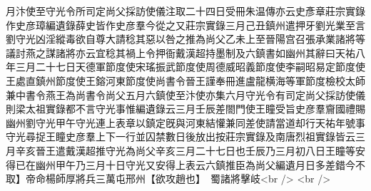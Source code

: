 月汴使至守光令所司定尚父採訪使儀注取二十四日受冊朱温傳亦云史彥章莊宗實錄作史彦璋編遺錄薛史皆作史彦羣今從之又莊宗實錄三月己丑鎮州遣押牙劉光業至言劉守光凶淫縱毒欲自尊大請稔其惡以咎之推為尚父乙未上至晉陽宫召張承業諸將等議討燕之謀諸將亦云宜稔其禍上令押衙戴漢超持墨制及六鎮書如幽州其辭曰天祐八年三月二十七日天德軍節度使宋瑤振武節度使周德威昭義節度使李嗣昭易定節度使王處直鎮州節度使王鎔河東節度使尚書令晉王謹奉冊進盧龍横海等軍節度檢校太師兼中書令燕王為尚書令尚父五月六鎮使至汴使亦集六月守光令有司定尚父採訪使儀則梁太祖實錄都不言守光事惟編遺錄云三月壬辰差閤門使王瞳受旨史彦羣齎國禮賜幽州劉守光甲午守光連上表章以鎮定旣與河東結懽兼同差使請當道却行天祐年號事守光尋捉王瞳史彦羣上下一行並囚禁數日後放出按莊宗實錄及南唐烈祖實錄皆云三月辛亥晉王遣戴漢超推守光為尚父辛亥三月二十七日也壬辰乃三月初八日王瞳等安得已在幽州甲午乃三月十日守光又安得上表云六鎮推臣為尚父編遺月日多差錯今不取】帝命楊師厚將兵三萬屯邢州【欲攻趙也】　蜀諸將擊岐<br />
<br />

